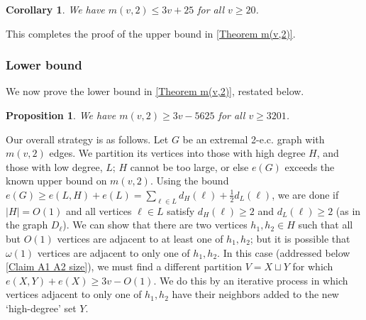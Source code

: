 \documentclass{article}
\newtheorem{prop}[thm]{Proposition}
\newtheorem{cor}[thm]{Corollary}
\theoremstyle{definition}
\begin{document}
\begin{cor} \label{m(v,2) asymptotic upper bound}
    We have $m(v,2)\le 3v+25$ for all $v\ge 20$.
\end{cor}

This completes the proof of the upper bound in \autoref{Theorem m(v,2)}.

\subsubsection{Lower bound}

We now prove the lower bound in \autoref{Theorem m(v,2)}, restated below.

\begin{prop} \label{Proposition m(v,2) lower bound}
    We have $m(v,2)\ge 3v-5625$ for all $v\ge 3201$.
\end{prop}

Our overall strategy is as follows. Let $G$ be an extremal 2-e.c. graph with $m(v,2)$ edges. We partition its vertices into those with high degree $H$, and those with low degree, $L$; $H$ cannot be too large, or else $e(G)$ exceeds the known upper bound on $m(v,2)$. Using the bound $e(G)\ge e(L,H)+e(L)=\sum_{\ell\in L}d_H(\ell)+\frac{1}{2}d_L(\ell)$, we are done if $|H|=O(1)$ and all vertices $\ell\in L$ satisfy $d_H(\ell)\ge 2$ and $d_L(\ell)\ge 2$ (as in the graph $D_\ell$). We can show that there are two vertices $h_1,h_2\in H$ such that all but $O(1)$ vertices are adjacent to at least one of $h_1,h_2$; but it is possible that $\omega(1)$ vertices are adjacent to only one of $h_1,h_2$. In this case (addressed below \autoref{Claim A1 A2 size}), we must find a different partition $V=X\sqcup Y$ for which $e(X,Y)+e(X)\ge 3v-O(1).$ We do this by an iterative process in which vertices adjacent to only one of $h_1,h_2$ have their neighbors added to the new `high-degree' set $Y$.
\end{document}
